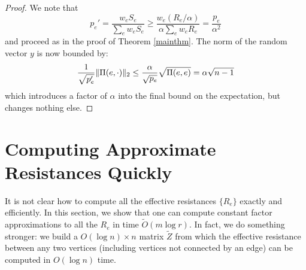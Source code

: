 \documentclass[11pt]{article}
\newcommand{\Otilde}{\widetilde{O}}
\newcommand{\Ztilde}{\widetilde{Z}}
\begin{document}
\begin{proof} We note that
\[ p_e'=\frac{w_eS_e}{\sum_e w_eS_e} \ge \frac{w_e(R_e/\alpha)}{\alpha \sum_e
w_eR_e} =
\frac{p_e}{\alpha^2}\] and proceed as in the proof of Theorem \ref{mainthm}. The
norm of the random vector $y$ is now bounded by:
\[ \frac{1}{\sqrt{p_e'}}\|\Pi(e,\cdot)\|_2 
\le  \frac{\alpha}{\sqrt{p_e}}\sqrt{\Pi(e,e)}\\
= \alpha\sqrt{n-1}\] which introduces a factor of $\alpha$ into the final bound
on the expectation, but changes nothing else.\end{proof}

\section{Computing Approximate Resistances Quickly}
It is not clear how to compute all the effective resistances $\{R_e\}$ exactly and
efficiently. In this section, we show that one can compute constant factor
approximations to all the $R_e$ in time $\Otilde(m \log r)$. In fact, we do
something stronger: we build a $O(\log n)\times n$  matrix $\Ztilde $ from which the effective resistance
between any two vertices (including vertices not connected by an edge) can be
computed in $O(\log n)$ time.
\end{document}
